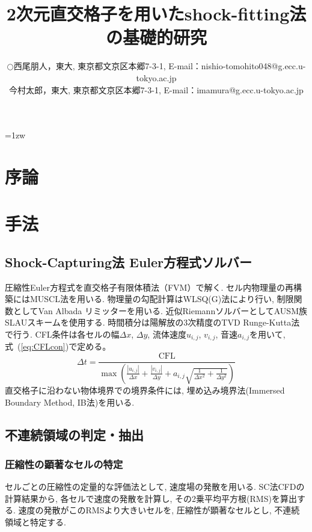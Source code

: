 \documentclass[a4j]{jarticle}
\title{2次元直交格子を用いたshock-fitting法の基礎的研究}   %
\author{\begin{tabular}{cl}
$\bigcirc$ & 西尾朋人，東大, 
             東京都文京区本郷7-3-1, 
             E-mail：nishio-tomohito048@g.ecc.u-tokyo.ac.jp \\
           & 今村太郎，東大,
             東京都文京区本郷7-3-1, 
             E-mail：imamura@g.ecc.u-tokyo.ac.jp
\end{tabular} }
\begin{document}
\baselineskip=1zw
\maketitle

\section{序論} \label{sec:intro}

\section{手法} \label{sec:method}
\subsection{Shock-Capturing法 Euler方程式ソルバー} \label{subsec:sc}

圧縮性Euler方程式を直交格子有限体積法（FVM）で解く.
セル内物理量の再構築にはMUSCL法を用いる.
物理量の勾配計算はWLSQ(G)法により行い, 制限関数としてVan Albada リミッターを用いる.
近似RiemannソルバーとしてAUSM族 SLAUスキームを使用する.
時間積分は陽解放の3次精度のTVD Runge-Kutta法で行う.
CFL条件は各セルの幅$\Delta x$, $\Delta y$, 流体速度$u_{i,j}$, $v_{i,j}$, 音速$a_{i, j}$を用いて, 式~(\ref{eq:CFLcon})で定める。
\begin{equation}
    \Delta t =
    \frac{\mathrm{CFL}}{
        \max\left(
            \frac{|u_{i,j}|}{\Delta x}
            + \frac{|v_{i,j}|}{\Delta y}
            + a_{i,j}
              \sqrt{
                \frac{1}{\Delta x^2}
                + \frac{1}{\Delta y^2}
              }
        \right)
    }
    \label{eq:CFLcon}
\end{equation}
直交格子に沿わない物体境界での境界条件には, 埋め込み境界法(Immersed Boundary Method, IB法)を用いる.

\subsection{不連続領域の判定・抽出} \label{subsec:discon}
\subsubsection{圧縮性の顕著なセルの特定} \label{subsubsec:comp}
セルごとの圧縮性の定量的な評価法として, 速度場の発散を用いる.
SC法CFDの計算結果から, 各セルで速度の発散を計算し, その2乗平均平方根(RMS)を算出する.
速度の発散がこのRMSより大きいセルを, 圧縮性が顕著なセルとし, 不連続領域と特定する.
\end{document}
